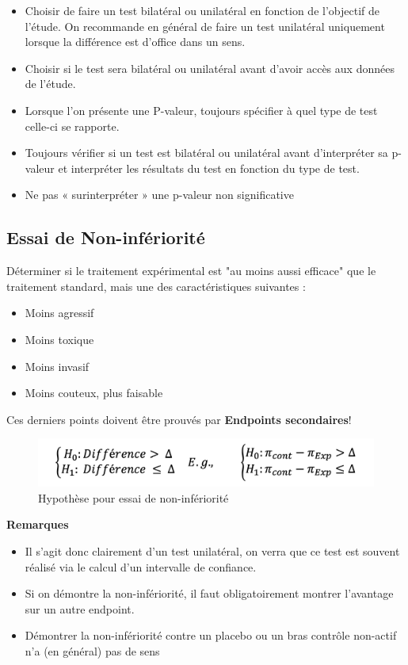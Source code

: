 \begin{itemize}
    \item Choisir de faire un test bilatéral ou unilatéral en fonction de l’objectif de l’étude. On recommande en général de faire un test unilatéral uniquement lorsque la différence est d’office dans un sens.
    \item Choisir si le test sera bilatéral ou unilatéral avant d’avoir accès aux données de l’étude.
    \item Lorsque l’on présente une P-valeur, toujours spécifier à quel type de test celle-ci se rapporte.
    \item Toujours vérifier si un test est bilatéral ou unilatéral avant d’interpréter sa p-valeur et interpréter les résultats du test en fonction du type de test.
    \item Ne pas « surinterpréter » une p-valeur non significative
\end{itemize}

\subsection{Essai de Non-infériorité}
Déterminer si le traitement expérimental est "au moins aussi efficace" que le traitement standard, mais une des caractéristiques suivantes :
\begin{itemize}
    \item Moins agressif
    \item Moins toxique
    \item Moins invasif
    \item Moins couteux, plus faisable
\end{itemize}
Ces derniers points doivent être prouvés par \textbf{Endpoints secondaires}!

\begin{figure}[H]
    \centering
    \includegraphics[scale=0.5]{images/nodiff.png}
    \caption{Hypothèse pour essai de non-infériorité}
    \label{fig:my_label}
\end{figure}

\textbf{Remarques}\\
\begin{itemize}
    \item Il s’agit donc clairement d’un test unilatéral, on verra que ce test est
souvent réalisé via le calcul d’un intervalle de confiance.
\item Si on démontre la non-infériorité, il faut obligatoirement montrer
l’avantage sur un autre endpoint.
\item Démontrer la non-infériorité contre un placebo ou un bras contrôle
non-actif n’a (en général) pas de sens
\end{itemize}


